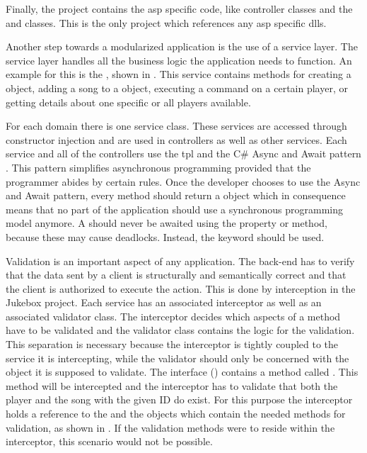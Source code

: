 Finally, the  project contains the \gls{asp} specific code, like controller classes and the  and  classes. This is the only project which references any \gls{asp} specific \glspl{dll}.



Another step towards a modularized application is the use of a service layer. The service layer handles all the business logic the application needs to function. An example for this is the , shown in . This service contains methods for creating a  object, adding a song to a  object, executing a command on a certain player, or getting details about one specific or all players available.

For each domain there is one service class. These services are accessed through constructor injection and are used in controllers as well as other services. Each service and all of the controllers use the \gls{tpl} and the C\# Async and Await pattern \cite{tpl}. This pattern simplifies asynchronous programming provided that the programmer abides by certain rules. Once the developer chooses to use the Async and Await pattern, every method should return a  object which in consequence means that no part of the application should use a synchronous programming model anymore. A  should never be awaited using the  property or  method, because these may cause deadlocks. Instead, the  keyword should be used.


Validation is an important aspect of any application. The back-end has to verify that the data sent by a client is structurally and semantically correct and that the client is authorized to execute the action. This is done by interception in the Jukebox project. Each service has an associated interceptor as well as an associated validator class. The interceptor decides which aspects of a method have to be validated and the validator class contains the logic for the validation. This separation is necessary because the interceptor is tightly coupled to the service it is intercepting, while the validator should only be concerned with the object it is supposed to validate. The  interface () contains a method called . This method will be intercepted and the interceptor has to validate that both the player and the song with the given ID do exist. For this purpose the interceptor holds a reference to the  and the  objects which contain the needed methods for validation, as shown in . If the validation methods were to reside within the interceptor, this scenario would not be possible.


